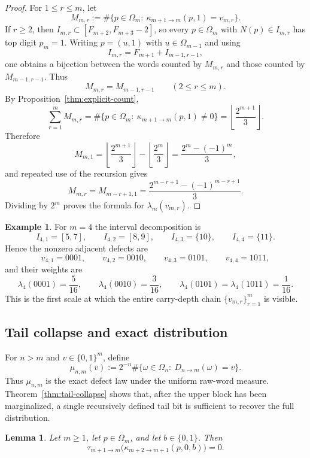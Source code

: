 \documentclass[11pt,reqno]{amsart}
\numberwithin{equation}{section}
\theoremstyle{plain}
\newtheorem{lemma}[theorem]{Lemma}
\theoremstyle{definition}
\newtheorem{example}[theorem]{Example}
\theoremstyle{remark}
\begin{document}
\begin{proof}
For $1\le r\le m$, let
\[
M_{m,r}
:=
\#\{p\in\Omega_m:\ \kappa_{m+1\to m}(p,1)=v_{m,r}\}.
\]
If $r\ge 2$, then $I_{m,r}\subset[F_{m+2},F_{m+3}-2]$, so every
$p\in\Omega_m$ with $N(p)\in I_{m,r}$ has top digit $p_m=1$.  Writing
$p=(u,1)$ with $u\in\Omega_{m-1}$ and using
\[
I_{m,r}=F_{m+1}+I_{m-1,r-1},
\]
one obtains a bijection between the words counted by $M_{m,r}$ and those
counted by $M_{m-1,r-1}$.  Thus
\[
M_{m,r}=M_{m-1,r-1}
\qquad (2\le r\le m).
\]
By Proposition~\ref{thm:explicit-count},
\[
\sum_{r=1}^m M_{m,r}
=
\#\{p\in\Omega_m:\ \kappa_{m+1\to m}(p,1)\ne 0\}
=
\left\lfloor\frac{2^{m+1}}{3}\right\rfloor.
\]
Therefore
\[
M_{m,1}
=
\left\lfloor\frac{2^{m+1}}{3}\right\rfloor
-
\left\lfloor\frac{2^m}{3}\right\rfloor
=
\frac{2^m-(-1)^m}{3},
\]
and repeated use of the recursion gives
\[
M_{m,r}=M_{m-r+1,1}
=
\frac{2^{m-r+1}-(-1)^{m-r+1}}{3}.
\]
Dividing by $2^m$ proves the formula for $\lambda_m(v_{m,r})$.
\end{proof}

\begin{example}
\label{ex:adjacent-spectrum-m4}
For $m=4$ the interval decomposition is
\[
I_{4,1}=[5,7],
\qquad
I_{4,2}=[8,9],
\qquad
I_{4,3}=\{10\},
\qquad
I_{4,4}=\{11\}.
\]
Hence the nonzero adjacent defects are
\[
v_{4,1}=0001,
\qquad
v_{4,2}=0010,
\qquad
v_{4,3}=0101,
\qquad
v_{4,4}=1011,
\]
and their weights are
\[
\lambda_4(0001)=\frac{5}{16},
\qquad
\lambda_4(0010)=\frac{3}{16},
\qquad
\lambda_4(0101)=\lambda_4(1011)=\frac{1}{16}.
\]
This is the first scale at which the entire carry-depth chain
$\{v_{m,r}\}_{r=1}^m$ is visible.
\end{example}

\subsection{Tail collapse and exact distribution}

For $n>m$ and $v\in\{0,1\}^m$, define
\[
\mu_{n,m}(v):=2^{-n}\#\{\omega\in\Omega_n:\ D_{n\to m}(\omega)=v\}.
\]
Thus $\mu_{n,m}$ is the exact defect law under the uniform raw-word measure.
Theorem~\ref{thm:tail-collapse} shows that, after the upper block has been
marginalized, a single recursively defined tail bit is sufficient to recover
the full distribution.

\begin{lemma}
\label{lem:zero-barrier}
Let $m\ge 1$, let $p\in\Omega_m$, and let $b\in\{0,1\}$.  Then
\[
\tau_{m+1\to m}\bigl(\kappa_{m+2\to m+1}(p,0,b)\bigr)=0.
\]
\end{lemma}
\end{document}
